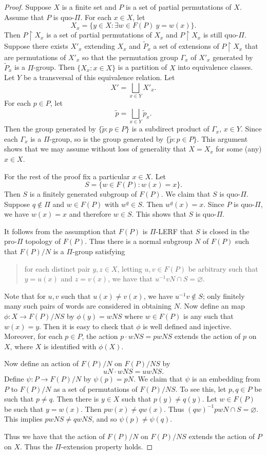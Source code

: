 \documentclass[10pt,a4paper]{amsart}
\theoremstyle{definition}
\theoremstyle{definition}
\numberwithin{equation}{section}
\begin{document}
\begin{proof} Suppose $X$ is a finite set and $P$ is a set of partial permutations of $X$. Assume that $P$ is quo-$\Pi$. For each $x\in X$, let
$$ X_x=\{y\in X\colon \exists w\in F(P)\ y=w(x)\}. $$
Then $P\upharpoonright X_x$ is a set of partial permutations of $X_x$ and $P\upharpoonright X_x$ is still quo-$\Pi$. Suppose there exists $X'_x$ extending $X_x$ and $\tilde{P}_x$ a set of extensions of $P\upharpoonright X_x$ that are permutations of $X'_x$ so that the permutation group $\Gamma_x$ of $X'_x$ generated by $\tilde{P}_x$ is a $\Pi$-group. Then $\{X_x\colon x\in X\}$ is a partition of $X$ into equivalence classes. Let $Y$ be a transversal of this equivalence relation. Let 
$$ X'=\bigsqcup_{x\in Y} X'_x. $$
For each $p\in P$, let 
$$ \tilde{p}=\bigsqcup_{x\in Y} \tilde{p}_x. $$
Then the group generated by $\{\tilde{p}\colon p\in P\}$ is a subdirect product of $\Gamma_x$, $x\in Y$. Since each $\Gamma_x$ is a $\Pi$-group, so is the group generated by $\{\tilde{p}\colon p\in P\}$. This argument shows that we may assume without loss of generality that $X=X_x$ for some (any) $x\in X$.

For the rest of the proof fix a particular $x\in X$. Let
$$ S=\{w\in F(P)\colon w(x)=x\}. $$
Then $S$ is a finitely generated subgroup of $F(P)$. We claim that $S$ is quo-$\Pi$. Suppose $q\not\in \Pi$ and $w\in F(P)$ with $w^q\in S$. Then $w^q(x)=x$. Since $P$ is quo-$\Pi$, we have $w(x)=x$ and therefore $w\in S$. This shows that $S$ is quo-$\Pi$. 

It follows from the assumption that $F(P)$ is $\Pi$-LERF that $S$ is closed in the pro-$\Pi$ topology of $F(P)$. Thus there is a normal subgroup $N$ of $F(P)$ such that $F(P)/N$ is a $\Pi$-group satisfying 
\begin{quote}
for each distinct pair $y, z\in X$, letting $u, v\in F(P)$ be arbitrary such that $y=u(x)$ and $z=v(x)$, we have that $u^{-1}vN\cap S=\varnothing$.
\end{quote} 
Note that for $u, v$ such that $u(x)\neq v(x)$, we have $u^{-1}v\not\in S$; only finitely many such pairs of words are considered in obtaining $N$. Now define an map $\phi\colon X\to F(P)/NS$ by $\phi(y)=wNS$ where $w\in F(P)$ is any such that $w(x)=y$. Then it is easy to check that $\phi$ is well defined and injective. Moreover, for each $p\in P$, the action $p\cdot wNS=pwNS$ extends the action of $p$ on $X$, where $X$ is identified with $\phi(X)$. 

Now define an action of $F(P)/N$ on $F(P)/NS$ by
$$ uN\cdot wNS=uwNS. $$
Define $\psi\colon P\to F(P)/N$ by $\psi(p)=pN$. We claim that $\psi$ is an embedding from $P$ to $F(P)/N$ as a set of permutations of $F(P)/NS$. To see this, let $p, q\in P$ be such that $p\neq q$. Then there is $y\in X$ such that $p(y)\neq q(y)$. Let $w\in F(P)$ be such that $y=w(x)$. Then $pw(x)\neq qw(x)$. Thus $(qw)^{-1}pwN\cap S=\varnothing$. This implies $pwNS\neq qwNS$, and so $\psi(p)\neq \psi(q)$. 

Thus we have that the action of $F(P)/N$ on $F(P)/NS$ extends the action of $P$ on $X$. Thus the $\Pi$-extension property holds.
\end{proof}
\end{document}
